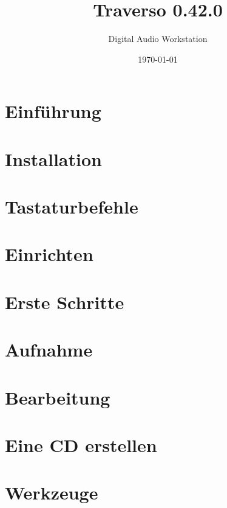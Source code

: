 \documentclass[a4paper,
               12pt,
               pdftex,
               twoside,
               smallheadings,
               headsepline,
               headinclude,
               DIV16,
               BCOR10mm
               ]{scrreprt}
\newcommand{\clearemptydoublepage}{\newpage\pagestyle{empty}\cleardoublepage}
\begin{document}
\title{Traverso 0.42.0}
\author{Digital Audio Workstation}
\date{\today}

\begin{titlepage}
  
\end{titlepage}
  \clearemptydoublepage
  



\tableofcontents


\chapter{Einführung\label{sect_introduction}}

\chapter{Installation\label{sect_installation}}

\chapter{Tastaturbefehle\label{sect_keyactions}}

\chapter{Einrichten\label{sect_setup}}

\chapter{Erste Schritte\label{sect_quickstart}}

\chapter{Aufnahme\label{sect_recording}}

\chapter{Bearbeitung\label{sect_mixing}}

\chapter{Eine CD erstellen\label{sect_cdburning}}

\chapter{Werkzeuge\label{sect_tools}}

\end{document}

